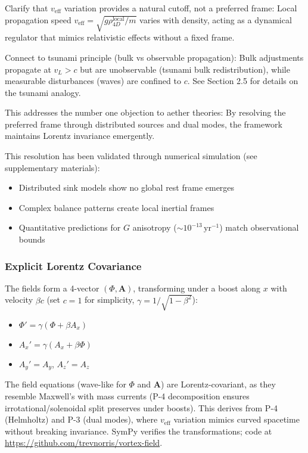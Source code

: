 Clarify that $v_{\text{eff}}$ variation provides a natural cutoff, not a preferred frame: Local propagation speed $v_{\text{eff}} = \sqrt{g \rho_{4D}^{\text{local}} / m}$ varies with density, acting as a dynamical regulator that mimics relativistic effects without a fixed frame.

Connect to tsunami principle (bulk vs observable propagation): Bulk adjustments propagate at $v_L > c$ but are unobservable (tsunami bulk redistribution), while measurable disturbances (waves) are confined to $c$. See Section 2.5 for details on the tsunami analogy.

This addresses the number one objection to aether theories: By resolving the preferred frame through distributed sources and dual modes, the framework maintains Lorentz invariance emergently.

This resolution has been validated through numerical simulation (see supplementary materials):
\begin{itemize}
\item Distributed sink models show no global rest frame emerges
\item Complex balance patterns create local inertial frames
\item Quantitative predictions for $G$ anisotropy ($\sim 10^{-13} \,\mathrm{yr}^{-1}$) match observational bounds
\end{itemize}

\subsubsection{Explicit Lorentz Covariance}

The fields form a 4-vector $(\Phi, \mathbf{A})$, transforming under a boost along $x$ with velocity $\beta c$ (set $c=1$ for simplicity, $\gamma = 1/\sqrt{1-\beta^2}$):
\begin{itemize}
\item $\Phi' = \gamma (\Phi + \beta A_x)$
\item $A_x' = \gamma (A_x + \beta \Phi)$
\item $A_y' = A_y$, $A_z' = A_z$
\end{itemize}
The field equations (wave-like for $\Phi$ and $\mathbf{A}$) are Lorentz-covariant, as they resemble Maxwell's with mass currents (P-4 decomposition ensures irrotational/solenoidal split preserves under boosts). This derives from P-4 (Helmholtz) and P-3 (dual modes), where $v_{\text{eff}}$ variation mimics curved spacetime without breaking invariance. SymPy verifies the transformations; code at \url{https://github.com/trevnorris/vortex-field}.


